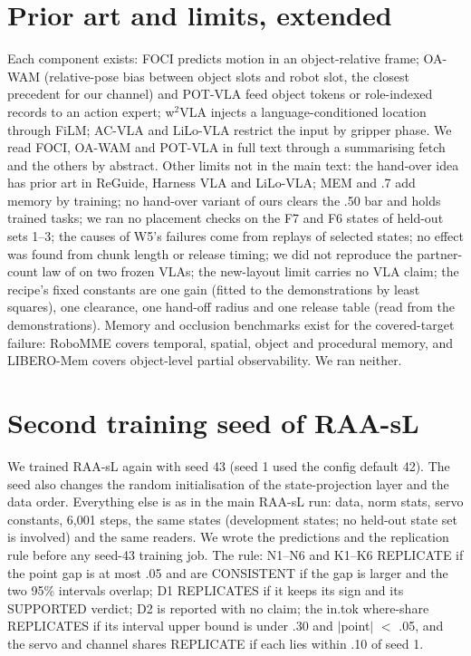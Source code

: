 \section{Prior art and limits, extended}
\label{app:I}

Each component exists: FOCI predicts motion in an object-relative frame; OA-WAM (relative-pose bias between object slots and robot slot, the closest precedent for our channel) and POT-VLA feed object tokens or role-indexed records to an action expert; w$^{2}$VLA \citep{w2vla2606} injects a language-conditioned location through FiLM; AC-VLA and LiLo-VLA restrict the input by gripper phase. We read FOCI, OA-WAM and POT-VLA in full text through a summarising fetch and the others by abstract. Other limits not in the main text: the hand-over idea has prior art in ReGuide, Harness VLA and LiLo-VLA; MEM and \pizero.7 add memory by training; no hand-over variant of ours clears the .50 bar and holds trained tasks; we ran no placement checks on the F7 and F6 states of held-out sets 1--3; the causes of W5's failures come from replays of selected states; no effect was found from chunk length or release timing; we did not reproduce the partner-count law of \citet{wang2607} on two frozen VLAs; the new-layout limit carries no VLA claim; the recipe's fixed constants are one gain (fitted to the demonstrations by least squares), one clearance, one hand-off radius and one release table (read from the demonstrations). Memory and occlusion benchmarks exist for the covered-target failure: RoboMME \citep{robomme2603} covers temporal, spatial, object and procedural memory, and LIBERO-Mem \citep{liberomem2511} covers object-level partial observability. We ran neither.

\section{Second training seed of RAA-sL}
\label{app:J}

We trained RAA-sL again with seed 43 (seed 1 used the config default 42). The seed also changes the random initialisation of the state-projection layer and the data order. Everything else is as in the main RAA-sL run: data, norm stats, servo constants, 6,001 steps, the same states (development states; no held-out state set is involved) and the same readers. We wrote the predictions and the replication rule before any seed-43 training job. The rule: N1--N6 and K1--K6 REPLICATE if the point gap is at most .05 and are CONSISTENT if the gap is larger and the two 95\% intervals overlap; D1 REPLICATES if it keeps its sign and its SUPPORTED verdict; D2 is reported with no claim; the in.tok where-share REPLICATES if its interval upper bound is under .30 and $|$point$|$ $<$ .05, and the servo and channel shares REPLICATE if each lies within .10 of seed 1.

